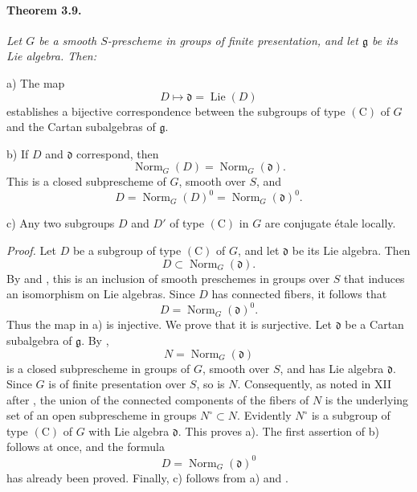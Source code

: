 
\paragraph{\textbf{Theorem 3.9.}}
{\itshape Let \(G\) be a smooth \(S\)-prescheme in groups of finite
presentation, and let \(\mathfrak g\) be its Lie algebra. Then:

\smallskip
\noindent
\textup{a)}
The map
\[
  D\longmapsto\mathfrak d=\operatorname{Lie}(D)
\]
establishes a bijective correspondence between the subgroups of
type \((\mathrm C)\) of \(G\) and the Cartan subalgebras of
\(\mathfrak g\).

\smallskip
\noindent
\textup{b)}
If \(D\) and \(\mathfrak d\) correspond, then
\[
  \operatorname{Norm}_G(D)=\operatorname{Norm}_G(\mathfrak d).
\]
This is a closed subprescheme of \(G\), smooth over \(S\), and
\[
  D=\operatorname{Norm}_G(D)^0
   =\operatorname{Norm}_G(\mathfrak d)^0.
\]

\smallskip
\noindent
\textup{c)}
Any two subgroups \(D\) and \(D'\) of type \((\mathrm C)\) in
\(G\) are conjugate étale locally.}

\emph{Proof.}
Let \(D\) be a subgroup of type \((\mathrm C)\) of \(G\), and let
\(\mathfrak d\) be its Lie algebra. Then
\[
  D\subset\operatorname{Norm}_G(\mathfrak d).
\]
By  and , this is an inclusion of smooth
preschemes in groups over \(S\) that induces an isomorphism on Lie
algebras. Since \(D\) has connected fibers, it follows that
\[
  D=\operatorname{Norm}_G(\mathfrak d)^0.
\]
Thus the map in \textup{a)} is injective. We prove that it is
surjective. Let \(\mathfrak d\) be a Cartan subalgebra of
\(\mathfrak g\). By ,
\[
  N=\operatorname{Norm}_G(\mathfrak d)
\]
is a closed subprescheme in groups of \(G\), smooth over \(S\), and
has Lie algebra \(\mathfrak d\). Since \(G\) is of finite
presentation over \(S\), so is \(N\). Consequently, as noted in
XII after , the union of the connected components of the fibers
of \(N\) is the underlying set of an open subprescheme in groups
\(N^\circ\subset N\). Evidently \(N^\circ\) is a subgroup of type
\((\mathrm C)\) of \(G\) with Lie algebra \(\mathfrak d\). This
proves \textup{a)}. The first assertion of \textup{b)} follows at
once, and the formula
\[
  D=\operatorname{Norm}_G(\mathfrak d)^0
\]
has already been proved. Finally, \textup{c)} follows from
\textup{a)} and .

